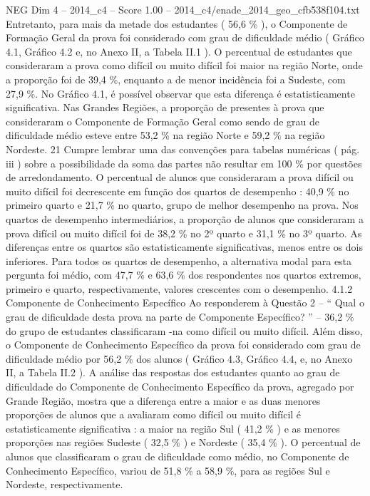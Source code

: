\begin{textsample}{NEG Dim 4 – 2014\_c4 – Score 1.00 – 2014\_c4/enade\_2014\_geo\_cfb538f104.txt}
Entretanto, para mais da metade dos estudantes ( 56,6 \% ), o Componente de Formação Geral da prova foi considerado com grau de dificuldade médio ( Gráfico 4.1, Gráfico 4.2 e, no Anexo II, a Tabela II.1 ).
O percentual de estudantes que consideraram a prova como difícil ou muito difícil foi maior na região Norte, onde a proporção foi de 39,4 \%, enquanto a de menor incidência foi a Sudeste, com 27,9 \%.
No Gráfico 4.1, é possível observar que esta diferença é estatisticamente significativa.
Nas Grandes Regiões, a proporção de presentes à prova que consideraram o Componente de Formação Geral como sendo de grau de dificuldade médio esteve entre 53,2 \% na região Norte e 59,2 \% na região Nordeste. 21 Cumpre lembrar uma das convenções para tabelas numéricas ( pág. iii ) sobre a possibilidade da soma das partes não resultar em 100 \% por questões de arredondamento.
O percentual de alunos que consideraram a prova difícil ou muito difícil foi decrescente em função dos quartos de desempenho : 40,9 \% no primeiro quarto e 21,7 \% no quarto, grupo de melhor desempenho na prova.
Nos quartos de desempenho intermediários, a proporção de alunos que consideraram a prova difícil ou muito difícil foi de 38,2 \% no 2º quarto e 31,1 \% no 3º quarto.
As diferenças entre os quartos são estatisticamente significativas, menos entre os dois inferiores.
Para todos os quartos de desempenho, a alternativa modal para esta pergunta foi médio, com 47,7 \% e 63,6 \% dos respondentes nos quartos extremos, primeiro e quarto, respectivamente, valores crescentes com o desempenho. 4.1.2 Componente de Conhecimento Específico Ao responderem à Questão 2 – “ Qual o grau de dificuldade desta prova na parte de Componente Específico? ” – 36,2 \% do grupo de estudantes classificaram -na como difícil ou muito difícil.
Além disso, o Componente de Conhecimento Específico da prova foi considerado com grau de dificuldade médio por 56,2 \% dos alunos ( Gráfico 4.3, Gráfico 4.4, e, no Anexo II, a Tabela II.2 ).
A análise das respostas dos estudantes quanto ao grau de dificuldade do Componente de Conhecimento Específico da prova, agregado por Grande Região, mostra que a diferença entre a maior e as duas menores proporções de alunos que a avaliaram como difícil ou muito difícil é estatisticamente significativa : a maior na região Sul ( 41,2 \% ) e as menores proporções nas regiões Sudeste ( 32,5 \% ) e Nordeste ( 35,4 \% ).
O percentual de alunos que classificaram o grau de dificuldade como médio, no Componente de Conhecimento Específico, variou de 51,8 \% a 58,9 \%, para as regiões Sul e Nordeste, respectivamente.

\end{textsample}
